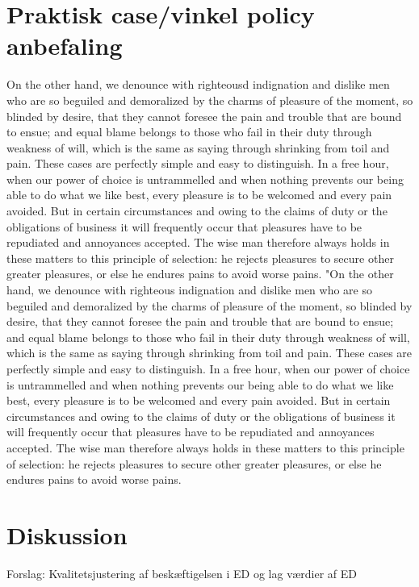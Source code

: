 \documentclass[a4paper, 12pt, titlepage]{article}
\begin{document}
\section{Praktisk case/vinkel policy anbefaling}
On the other hand, we denounce with righteousd indignation and dislike men who are so beguiled and demoralized by the charms of pleasure of the moment, so blinded by desire, that they cannot foresee the pain and trouble that are bound to ensue; and equal blame belongs to those who fail in their duty through weakness of will, which is the same as saying through shrinking from toil and pain. These cases are perfectly simple and easy to distinguish. In a free hour, when our power of choice is untrammelled and when nothing prevents our being able to do what we like best, every pleasure is to be welcomed and every pain avoided. But in certain circumstances and owing to the claims of duty or the obligations of business it will frequently occur that pleasures have to be repudiated and annoyances accepted. The wise man therefore always holds in these matters to this principle of selection: he rejects pleasures to secure other greater pleasures, or else he endures pains to avoid worse pains. "On the other hand, we denounce with righteous indignation and dislike men who are so beguiled and demoralized by the charms of pleasure of the moment, so blinded by desire, that they cannot foresee the pain and trouble that are bound to ensue; and equal blame belongs to those who fail in their duty through weakness of will, which is the same as saying through shrinking from toil and pain. These cases are perfectly simple and easy to distinguish. In a free hour, when our power of choice is untrammelled and when nothing prevents our being able to do what we like best, every pleasure is to be welcomed and every pain avoided. But in certain circumstances and owing to the claims of duty or the obligations of business it will frequently occur that pleasures have to be repudiated and annoyances accepted. The wise man therefore always holds in these matters to this principle of selection: he rejects pleasures to secure other greater pleasures, or else he endures pains to avoid worse pains.
\section{Diskussion}
Forslag: Kvalitetsjustering af beskæftigelsen i ED og lag værdier af ED 
\end{document}
